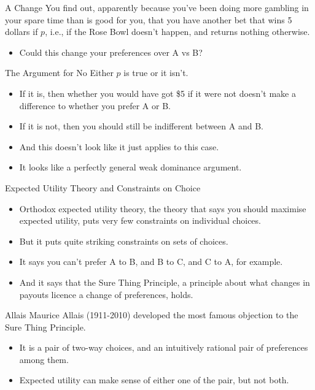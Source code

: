 \documentclass[
  ignorenonframetext,
]{beamer}
\providecommand{\tightlist}{%
  \setlength{\itemsep}{0pt}\setlength{\parskip}{0pt}}
\renewcommand{\,}{\text{, }}
\begin{document}
\begin{frame}{A Change}
\protect\hypertarget{a-change}{}
You find out, apparently because you've been doing more gambling in your
spare time than is good for you, that you have another bet that wins 5
dollars if \(p\), i.e., if the Rose Bowl doesn't happen, and returns
nothing otherwise.

\begin{itemize}
\tightlist
\item
  Could this change your preferences over A vs B?
\end{itemize}
\end{frame}

\begin{frame}{The Argument for No}
\protect\hypertarget{the-argument-for-no}{}
Either \(p\) is true or it isn't.

\begin{itemize}
\tightlist
\item
  If it is, then whether you would have got \$5 if it were not doesn't
  make a difference to whether you prefer A or B.
\item
  If it is not, then you should still be indifferent between A and B.
\item
  And this doesn't look like it just applies to this case.
\item
  It looks like a perfectly general weak dominance argument.
\end{itemize}
\end{frame}

\begin{frame}{Expected Utility Theory and Constraints on Choice}
\protect\hypertarget{expected-utility-theory-and-constraints-on-choice}{}
\begin{itemize}
\tightlist
\item
  Orthodox expected utility theory, the theory that says you should
  maximise expected utility, puts very few constraints on individual
  choices.
\item
  But it puts quite striking constraints on sets of choices.
\item
  It says you can't prefer A to B, and B to C, and C to A, for example.
\item
  And it says that the Sure Thing Principle, a principle about what
  changes in payouts licence a change of preferences, holds.
\end{itemize}
\end{frame}

\begin{frame}{Allais}
\protect\hypertarget{allais}{}
Maurice Allais (1911-2010) developed the most famous objection to the
Sure Thing Principle.

\begin{itemize}
\tightlist
\item
  It is a pair of two-way choices, and an intuitively rational pair of
  preferences among them.
\item
  Expected utility can make sense of either one of the pair, but not
  both.
\end{itemize}
\end{frame}
\end{document}
